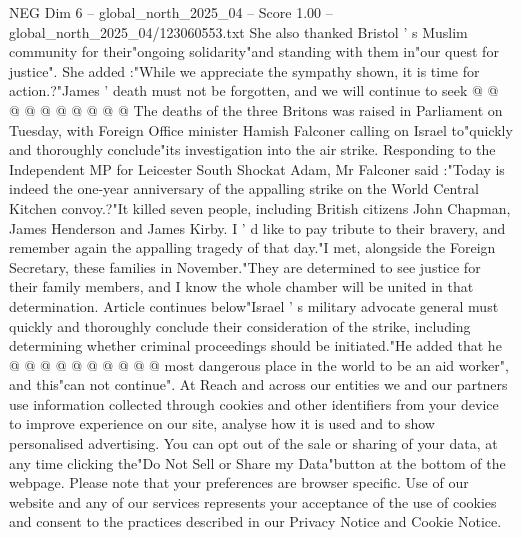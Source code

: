 \begin{textsample}{NEG Dim 6 – global\_north\_2025\_04 – Score 1.00 – global\_north\_2025\_04/123060553.txt}
She also thanked Bristol ' s Muslim community for their"ongoing solidarity"and standing with them in"our quest for justice".
She added :"While we appreciate the sympathy shown, it is time for action.?"James ' death must not be forgotten, and we will continue to seek @ @ @ @ @ @ @ @ @ @ The deaths of the three Britons was raised in Parliament on Tuesday, with Foreign Office minister Hamish Falconer calling on Israel to"quickly and thoroughly conclude"its investigation into the air strike.
Responding to the Independent MP for Leicester South Shockat Adam, Mr Falconer said :"Today is indeed the one-year anniversary of the appalling strike on the World Central Kitchen convoy.?"It killed seven people, including British citizens John Chapman, James Henderson and James Kirby.
I ' d like to pay tribute to their bravery, and remember again the appalling tragedy of that day."I met, alongside the Foreign Secretary, these families in November."They are determined to see justice for their family members, and I know the whole chamber will be united in that determination.
Article continues below"Israel ' s military advocate general must quickly and thoroughly conclude their consideration of the strike, including determining whether criminal proceedings should be initiated."He added that he @ @ @ @ @ @ @ @ @ @ most dangerous place in the world to be an aid worker", and this"can not continue".
At Reach and across our entities we and our partners use information collected through cookies and other identifiers from your device to improve experience on our site, analyse how it is used and to show personalised advertising.
You can opt out of the sale or sharing of your data, at any time clicking the"Do Not Sell or Share my Data"button at the bottom of the webpage.
Please note that your preferences are browser specific.
Use of our website and any of our services represents your acceptance of the use of cookies and consent to the practices described in our Privacy Notice and Cookie Notice.

\end{textsample}
